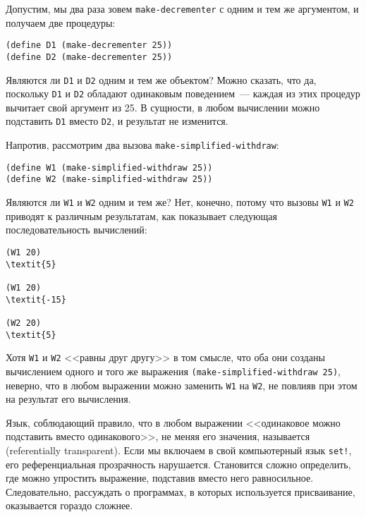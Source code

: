 Допустим, мы два раза зовем {\tt make-decrementer}
с одним и тем же аргументом, и получаем две процедуры:

\begin{Verbatim}[fontsize=\small]
(define D1 (make-decrementer 25))
(define D2 (make-decrementer 25))
\end{Verbatim}
Являются ли {\tt D1} и {\tt D2} одним и тем же объектом?
Можно сказать, что да, поскольку {\tt D1} и {\tt D2}
обладают одинаковым поведением~--- каждая из этих процедур вычитает
свой аргумент из 25.  В сущности, в любом вычислении можно подставить
{\tt D1} вместо {\tt D2}, и результат не изменится.

Напротив, рассмотрим два вызова
{\tt make-simplified-withdraw}:

\begin{Verbatim}[fontsize=\small]
(define W1 (make-simplified-withdraw 25))
(define W2 (make-simplified-withdraw 25))
\end{Verbatim}
Являются ли {\tt W1} и {\tt W2} одним и тем же?  Нет,
конечно, потому что вызовы {\tt W1} и {\tt W2} приводят
к различным результатам, как показывает следующая последовательность
вычислений:

\begin{Verbatim}[fontsize=\small]
(W1 20)
\textit{5}

(W1 20)
\textit{-15}

(W2 20)
\textit{5}
\end{Verbatim}
Хотя
{\tt W1} и {\tt W2} <<равны друг другу>> в том смысле, что
оба они созданы вычислением одного и того же выражения
{\tt (make-simplified-withdraw 25)}, неверно, что в любом
выражении можно заменить {\tt W1} на {\tt W2}, не
повлияв при этом на результат его вычисления.

Язык, соблюдающий правило, что в любом выражении <<одинаковое
можно подставить вместо одинакового>>, не меняя его значения,
называется  (referentially transparent).  Если мы
включаем в свой компьютерный язык {\tt set!}, его
референциальная прозрачность нарушается.  Становится сложно
определить, где можно упростить выражение, подставив вместо него
равносильное.  Следовательно, рассуждать о программах, в которых используется
присваивание, оказывается гораздо сложнее.

